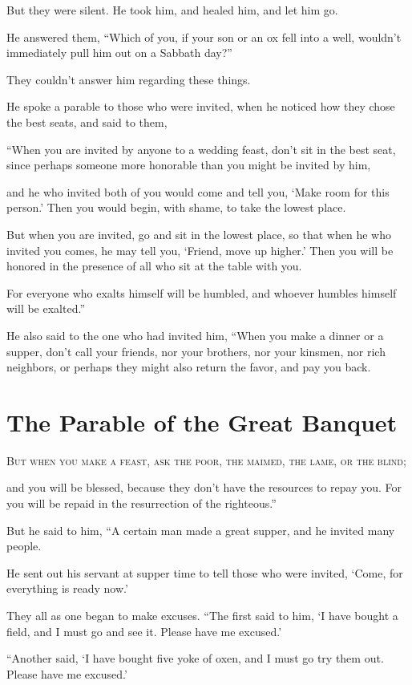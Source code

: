 But they were silent. He took him, and healed him, and let him go.

He answered them, “Which of you, if your son or an ox fell into a well, wouldn’t immediately pull him out on a Sabbath day?”

They couldn’t answer him regarding these things.

He spoke a parable to those who were invited, when he noticed how they chose the best seats, and said to them,

“When you are invited by anyone to a wedding feast, don’t sit in the best seat, since perhaps someone more honorable than you might be invited by him,

and he who invited both of you would come and tell you, ‘Make room for this person.’ Then you would begin, with shame, to take the lowest place.

But when you are invited, go and sit in the lowest place, so that when he who invited you comes, he may tell you, ‘Friend, move up higher.’ Then you will be honored in the presence of all who sit at the table with you.

For everyone who exalts himself will be humbled, and whoever humbles himself will be exalted.”

He also said to the one who had invited him, “When you make a dinner or a supper, don’t call your friends, nor your brothers, nor your kinsmen, nor rich neighbors, or perhaps they might also return the favor, and pay you back.


\clearpage \section*{The Parable of the Great Banquet}

\lettrine{B}{ut when you make a feast, ask the poor, the maimed, the lame, or the blind;}

and you will be blessed, because they don’t have the resources to repay you. For you will be repaid in the resurrection of the righteous.”

But he said to him, “A certain man made a great supper, and he invited many people.

He sent out his servant at supper time to tell those who were invited, ‘Come, for everything is ready now.’

They all as one began to make excuses. “The first said to him, ‘I have bought a field, and I must go and see it. Please have me excused.’

“Another said, ‘I have bought five yoke of oxen, and I must go try them out. Please have me excused.’

